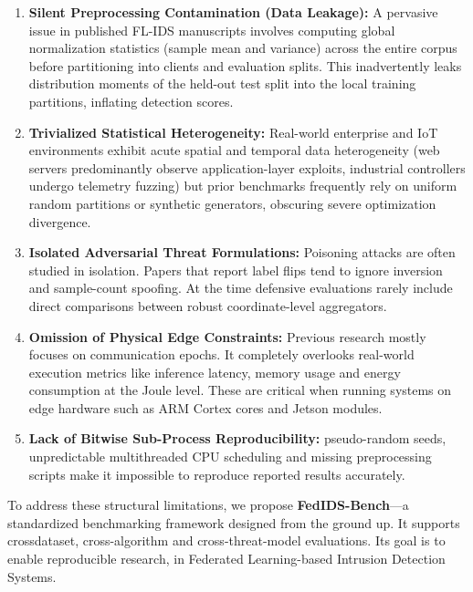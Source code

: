 \documentclass[conference]{IEEEtran}
\begin{document}
\begin{enumerate}
    \item \textbf{Silent Preprocessing Contamination (Data Leakage):} A pervasive issue in published FL-IDS manuscripts involves computing global normalization statistics (sample mean and variance) across the entire corpus before partitioning into clients and evaluation splits. This inadvertently leaks distribution moments of the held-out test split into the local training partitions, inflating detection scores.
    \item \textbf{Trivialized Statistical Heterogeneity:} Real-world enterprise and IoT environments exhibit acute spatial and temporal data heterogeneity (web servers predominantly observe application-layer exploits, industrial controllers undergo telemetry fuzzing) but prior benchmarks frequently rely on uniform random partitions or synthetic generators, obscuring severe optimization divergence.
    \item \textbf{Isolated Adversarial Threat Formulations:} Poisoning attacks are often studied in isolation. Papers that report label flips tend to ignore inversion and sample-count spoofing. At the time defensive evaluations rarely include direct comparisons between robust coordinate-level aggregators.
    \item \textbf{Omission of Physical Edge Constraints:} Previous research mostly focuses on communication epochs. It completely overlooks real-world execution metrics like inference latency, memory usage and energy consumption at the Joule level. These are critical when running systems on edge hardware such as ARM Cortex cores and Jetson modules.
    \item \textbf{Lack of Bitwise Sub-Process Reproducibility:} pseudo-random seeds, unpredictable multithreaded CPU scheduling and missing preprocessing scripts make it impossible to reproduce reported results accurately.
\end{enumerate}

To address these structural limitations, we propose \textbf{FedIDS-Bench}---a standardized benchmarking framework designed from the ground up. It supports crossdataset, cross-algorithm and cross-threat-model evaluations. Its goal is to enable reproducible research, in Federated Learning-based Intrusion Detection Systems.
\end{document}
